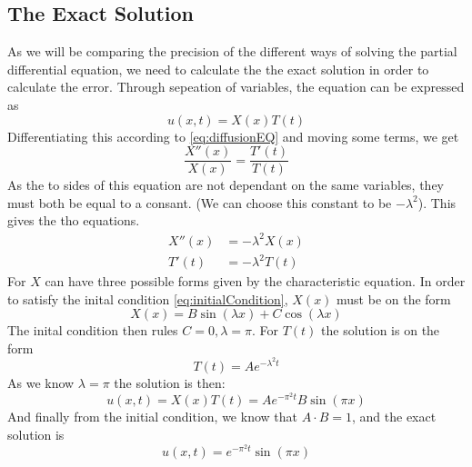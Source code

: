 \subsection{The Exact Solution}
As we will be comparing the precision of the different ways of solving the partial differential equation, we need to calculate the the exact solution in order to calculate the error.
Through sepeation of variables, the equation can be expressed as
\begin{equation}
    u(x,t) = X(x)T(t)
    \label{eq:separated}
\end{equation}
Differentiating this according to \eqref{eq:diffusionEQ} and moving some terms, we get
\begin{equation*}
    \frac{X''(x)}{X(x)} = \frac{T'(t)}{T(t)}
\end{equation*}
As the to sides of this equation are not dependant on the same variables, they must both be equal to a consant. (We can choose this constant to be $-\lambda ^2$). This gives the tho equations.
\begin{equation*}
    \begin{split}
        X''(x) &= -\lambda ^2 X(x) \\
        T'(t) &= -\lambda^2 T(t)
    \end{split}
\end{equation*}
For $X$ can have three possible forms given by the characteristic equation. In order to satisfy the inital condition \eqref{eq:initialCondition}, $X(x)$ must be on the form
\begin{equation*}
    X(x) = B\sin(\lambda x) + C\cos(\lambda x)
\end{equation*}
The inital condition then rules $C=0, \lambda = \pi$. For $T(t)$ the solution is on the form
\begin{equation*}
    T(t) = Ae^{-\lambda^2t}
\end{equation*}
As we know $\lambda =\pi$ the solution is then:
\begin{equation*}
    u(x,t) = X(x)T(t) = Ae^{-\pi^2 t}B\sin(\pi x)
\end{equation*}
And finally from the initial condition, we know that $A\cdot B = 1$, and the exact solution is
\begin{equation}
    u(x,t) = e^{-\pi^2 t}\sin(\pi x)
    \label{eq:exact}
\end{equation}
